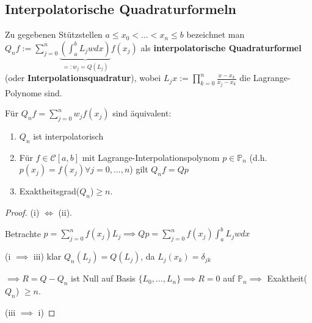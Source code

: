 \subsection{Interpolatorische Quadraturformeln}

\begin{definition}
	Zu gegebenen Stützstellen $a \leq x_0 < ... < x_n \leq b$ bezeichnet man $Q_nf := \sum_{j=0}^{n} \underbrace{\left(\int_{a}^{b} L_jw dx\right)}_{=: w_j = Q(L_j)} f(x_j)$ als \textbf{interpolatorische Quadraturformel} (oder \textbf{Interpolationsquadratur}), wobei $L_jx := \prod_{k=0}^{n}\frac{x - x_k}{x_j - x_k}$ die Lagrange-Polynome sind.
\end{definition}

\begin{theorem}
	Für $Q_nf = \sum_{j=0}^{n} w_j f(x_j)$ sind äquivalent:
	\begin{enumerate}
		\item $Q_n$ ist interpolatorisch
		\item Für $f \in \mathcal{C}[a,b]$ mit Lagrange-Interpolationspolynom $p \in \mathbb{P}_n$ (d.h. $p(x_j) = f(x_j) \forall j=0, ..., n$) gilt $Q_nf = Qp$
		\item Exaktheitsgrad($Q_n$)$\geq n$.
	\end{enumerate}
\end{theorem}

\begin{proof}
	(i) $\iff$ (ii).
	
	Betrachte $p = \sum_{j=0}^{n} f(x_j)L_j \implies Qp = \sum_{j=0}^{n} f(x_j) \int_{a}^{b}L_jw dx$
	
	(i $\implies$ iii) klar $Q_n(L_j) = Q(L_j)$, da $L_j(x_k) = \delta_{jk}$
	
	$\implies R=Q-Q_n$ ist Null auf Basis $\{L_0, ..., L_n\} \implies R=0$ auf $\mathbb{P}_n \implies$ Exaktheit($Q_n$) $\geq n$.
	
	(iii $\implies$ i) \checkmark
\end{proof}

